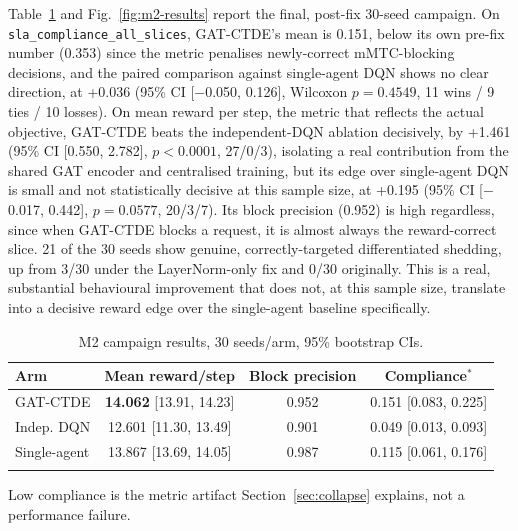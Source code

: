 \documentclass[pdflatex,sn-basic,Numbered]{sn-jnl}%
\begin{document}
Table~\ref{tab:m2-results} and Fig.~\ref{fig:m2-results} report the
final, post-fix 30-seed campaign. On \texttt{sla\_compliance\_all\_slices},
GAT-CTDE's mean is 0.151, below its own pre-fix number (0.353) since
the metric penalises newly-correct mMTC-blocking decisions, and the paired comparison against single-agent DQN shows no clear direction, at +0.036 (95\% CI [$-$0.050, 0.126], Wilcoxon $p=0.4549$, 11 wins / 9 ties / 10 losses). On mean reward per step, the metric that reflects the actual objective, GAT-CTDE beats the independent-DQN ablation decisively, by +1.461 (95\% CI [0.550, 2.782], $p<0.0001$, 27/0/3), isolating a real contribution from the shared GAT encoder and centralised training, but its edge over single-agent DQN is small and not statistically decisive at this sample size, at +0.195 (95\% CI [$-$0.017, 0.442], $p=0.0577$, 20/3/7). Its block precision (0.952) is high regardless, since when GAT-CTDE blocks a request, it is almost always the reward-correct slice. 21 of the 30 seeds show genuine, correctly-targeted differentiated shedding, up from 3/30 under the LayerNorm-only fix and 0/30 originally. This is a real, substantial behavioural improvement that does not, at this sample size, translate into a decisive reward edge over the single-agent baseline specifically.

\begin{table}[t]
\caption{M2 campaign results, 30 seeds/arm, 95\% bootstrap CIs.}
\label{tab:m2-results}
\centering
\begin{tabular}{lccc}
\toprule
Arm & Mean reward/step & Block precision & Compliance$^{\ast}$ \\
\midrule
GAT-CTDE & \textbf{14.062} [13.91, 14.23] & 0.952 & 0.151 [0.083, 0.225] \\
Indep. DQN & 12.601 [11.30, 13.49] & 0.901 & 0.049 [0.013, 0.093] \\
Single-agent & 13.867 [13.69, 14.05] & 0.987 & 0.115 [0.061, 0.176] \\
\botrule
\end{tabular}
\begin{tablenotes}
\footnotesize
\item[$\ast$] Low compliance is the metric artifact Section~\ref{sec:collapse} explains, not a performance failure.
\end{tablenotes}
\end{table}
\end{document}
